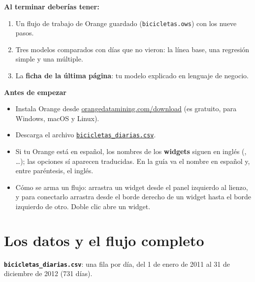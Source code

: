 \documentclass[11pt]{article}
\newcommand{\urldatos}{https://github.com/craljimenez/An-lisis_y_Visualizacion_de_Datos_para_la_Toma_de_Decisiones/raw/main/clases/semana10-clase20-regresion-lineal-python/datos/bicicletas_diarias.csv}
\newcommand{\urlorange}{https://orangedatamining.com/download/}
\newcommand{\widget}[1]{\leavevmode{\color{esumerNavyDark}\textbf{#1}}}
\begin{document}
\textbf{Al terminar deberías tener:}
\begin{enumerate}[itemsep=1pt, topsep=2pt]
  \item Un flujo de trabajo de Orange guardado (\texttt{bicicletas.ows}) con
    los nueve pasos.
  \item Tres modelos comparados con días que no vieron: la línea base, una
    regresión simple y una múltiple.
  \item La \textbf{ficha de la última página}: tu modelo explicado en
    lenguaje de negocio.
\end{enumerate}

\textbf{Antes de empezar}
\begin{itemize}[itemsep=1pt, topsep=2pt]
  \item Instala Orange desde
    \href{\urlorange}{\color{esumerOrange}orangedatamining.com/download} (es
    gratuito, para Windows, macOS y Linux).
  \item Descarga el archivo
    \href{\urldatos}{\color{esumerOrange}\texttt{bicicletas\_diarias.csv}}.
  \item Si tu Orange está en español, los nombres de los \textbf{widgets}
    siguen en inglés (\widget{File}, \widget{Linear Regression}\ldots); las
    opciones sí aparecen traducidas. En la guía va el nombre en español y,
    entre paréntesis, el inglés.
  \item Cómo se arma un flujo: arrastra un widget desde el panel izquierdo
    al lienzo, y para conectarlo arrastra desde el borde derecho de un
    widget hasta el borde izquierdo de otro. Doble clic abre un widget.
\end{itemize}

\clearpage
\section*{\color{esumerNavy}Los datos y el flujo completo}

\textbf{\texttt{bicicletas\_diarias.csv}}: una fila por día, del 1 de enero
de 2011 al 31 de diciembre de 2012 (731 días).
\end{document}
